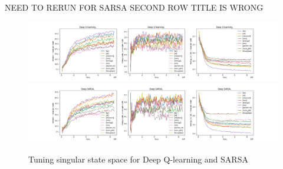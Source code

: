 NEED TO RERUN FOR SARSA SECOND ROW TITLE
IS WRONG







\begin{figure}[H]
\centering
\hspace*{-3.3cm}  
\includegraphics[scale=0.40]{plots/state_space/singular_state_space_small.png}\\
\hspace*{-3.3cm}  
\includegraphics[scale=0.40]{plots/state_space/singular_state_space_sarsa_small.png}
  \caption{Tuning singular state space for Deep Q-learning and SARSA}
\end{figure}

